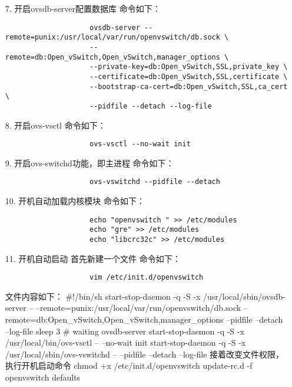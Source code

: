 \documentclass[a4paper,left=1.5cm,right=1.5cm,11pt]{article}
\begin{document}
\begin{itemize}
\begin{lstlisting}
				 \end{lstlisting}
		\item[7.]开启ovsdb-server配置数据库
				命令如下：
				 \begin{lstlisting}
					ovsdb-server --remote=punix:/usr/local/var/run/openvswitch/db.sock \
					--remote=db:Open_vSwitch,Open_vSwitch,manager_options \
					--private-key=db:Open_vSwitch,SSL,private_key \
					--certificate=db:Open_vSwitch,SSL,certificate \
					--bootstrap-ca-cert=db:Open_vSwitch,SSL,ca_cert \
					--pidfile --detach --log-file
				 \end{lstlisting}
		\item[8.]开启ovs-vsctl
				命令如下：
				 \begin{lstlisting}
					ovs-vsctl --no-wait init
				 \end{lstlisting}
		\item[9.]开启ovs-switchd功能，即主进程
				命令如下：
				 \begin{lstlisting}
					ovs-vswitchd --pidfile --detach
				 \end{lstlisting}
		\item[10.]开机自动加载内核模块
				命令如下：
				 \begin{lstlisting}
					echo "openvswitch " >> /etc/modules
					echo "gre" >> /etc/modules
					echo "libcrc32c" >> /etc/modules
				 \end{lstlisting}
		\item[11.]开机自动启动
				首先新建一个文件
				命令如下：
				 \begin{lstlisting}
					vim /etc/init.d/openvswitch
				 \end{lstlisting}
				文件内容如下：
				#!/bin/sh
				start-stop-daemon -q -S -x /usr/local/sbin/ovsdb-server -- --remote=punix:/usr/local/var/run/openvswitch/db.sock --remote=db:Open_vSwitch,Open_vSwitch,manager_options --pidfile --detach --log-file
				sleep 3 # waiting ovsdb-server 
				start-stop-daemon -q -S -x /usr/local/bin/ovs-vsctl -- --no-wait init
				start-stop-daemon -q -S -x /usr/local/sbin/ovs-vswitchd -- --pidfile --detach --log-file
				接着改变文件权限，执行开机启动命令
				chmod +x /etc/init.d/openvswitch
				update-rc.d -f openvswitch defaults
	\end{itemize}
\end{document}

